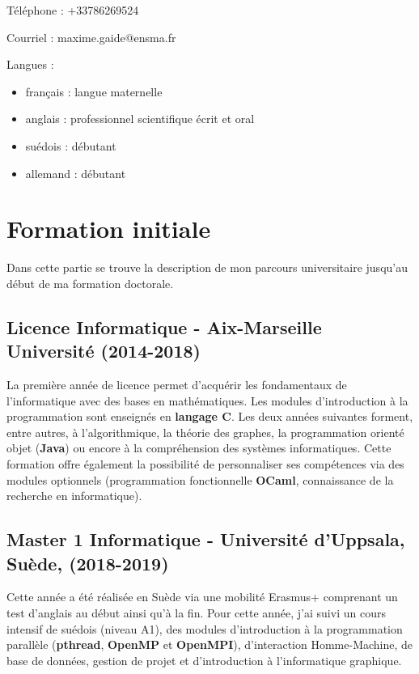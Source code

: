 \documentclass[11pt,a4paper,oneside]{article}
\begin{document}
\noindent Téléphone : +33786269524

\noindent Courriel : maxime.gaide@ensma.fr

\noindent Langues :
\begin{itemize}
	\item français : langue maternelle
	\item anglais : professionnel scientifique écrit et oral
	\item suédois : débutant
	\item allemand : débutant
\end{itemize}

\section{Formation initiale}

Dans cette partie se trouve la description de mon parcours universitaire jusqu'au début de ma formation doctorale.

\subsection{Licence Informatique - Aix-Marseille Université (2014-2018)}

La première année de licence permet d'acquérir les fondamentaux de
l'informatique avec des bases en mathématiques. %
Les modules d'introduction à la programmation sont enseignés en \textbf{langage
	C}. %
Les deux années suivantes forment, entre autres, à l'algorithmique, la théorie
des graphes, la programmation orienté objet (\textbf{Java}) ou encore à la
compréhension des systèmes informatiques. %
Cette formation offre également la possibilité de personnaliser ses compétences
via des modules optionnels (programmation fonctionnelle \textbf{OCaml},
connaissance de la recherche en informatique). %

\subsection{Master 1 Informatique - Université d'Uppsala, Suède, (2018-2019)}

Cette année a été réalisée en Suède via une mobilité Erasmus+ comprenant un test
d'anglais au début ainsi qu'à la fin. %
Pour cette année, j'ai suivi un cours intensif de suédois (niveau A1), des
modules d'introduction à la programmation parallèle (\textbf{pthread},
\textbf{OpenMP} et \textbf{OpenMPI}), d'interaction Homme-Machine, de base de
données, gestion de projet et d'introduction à l'informatique graphique. %
\end{document}
